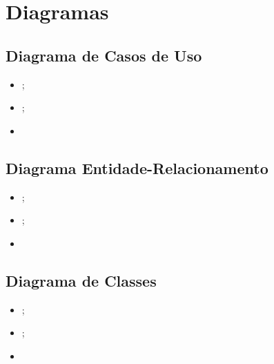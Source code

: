 \section{Diagramas}

\subsection{Diagrama de Casos de Uso}

\begin{itemize}
  \item \lipsum[1][1];
  \item \lipsum[1][1];
  \item \lipsum[1][1]
\end{itemize}

\subsection{Diagrama Entidade-Relacionamento}

\begin{itemize}
  \item \lipsum[1][1];
  \item \lipsum[1][1];
  \item \lipsum[1][1]
\end{itemize}

\subsection{Diagrama de Classes}

\begin{itemize}
  \item \lipsum[1][1];
  \item \lipsum[1][1];
  \item \lipsum[1][1]
\end{itemize}
